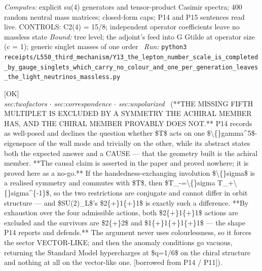 \begin{description}
\emph{Computes:} explicit su(4) generators and tensor-product Casimir spectra; 400 random neutral mass matrices; closed-form caps; P14 and P15 sentences read live. CONTROLS: C2(4) = 15/8; independent operator coefficients leave no massless state
 \emph{Bound:} tree level; the adjoint's feed into G Gtilde at operator size (c = 1); generic singlet masses of one order
\ \emph{Run:} \texttt{python3 receipts/L550\_third\_mechanism/Y13\_the\_lepton\_number\_scale\_is\_completed\_by\_gauge\_singlets\_which\_carry\_no\_colour\_and\_one\_per\_generation\_leaves\_the\_light\_neutrinos\_massless.py}
\item[\label{rcpt:W1_the_two_plus_one_plus_one_is_excluded_by_a_symmetry_the_chiral_member_does_not_have}\textbf{}\quad\texttt{W1\_the\_two\_plus\_one\_plus\_one\_is\_excluded\_by\_a\_symmetry\_the\_chiral\_member\_does\_not\_have}]\hfill\textsf{[OK]}\\
\textit{sec:twofactors \ensuremath{\cdot} sec:correspondence \ensuremath{\cdot} sec:unpolarized} \ (**THE MISSING FIFTH MULTIPLET IS EXCLUDED BY A SYMMETRY THE ACHIRAL MEMBER HAS, AND THE CHIRAL MEMBER PROVABLY DOES NOT.** P14 records as well-posed and declines the question whether \$T\$ acts on one \$\textbackslash\{\}gamma\textasciicircum{}5\$-eigenspace of the wall mode and trivially on the other, while its abstract states both the expected answer and a CAUSE --- that the geometry built is the achiral member. **The causal claim is asserted in the paper and proved nowhere; it is proved here as a no-go.** If the handedness-exchanging involution \$\textbackslash\{\}sigma\$ is a realised symmetry and commutes with \$T\$, then \$T\textbar{}\_-=\textbackslash\{\}sigma T\textbar{}\_+\textbackslash\{\}sigma\textasciicircum{}\{-1\}\$, so the two restrictions are conjugate and cannot differ in orbit structure --- and \$SU(2)\_L\$'s \$2\{+\}1\{+\}1\$ is exactly such a difference. **By exhaustion over the four admissible actions, both \$2\{+\}1\{+\}1\$ actions are excluded and the survivors are \$2\{+\}2\$ and \$1\{+\}1\{+\}1\{+\}1\$ --- the shape P14 reports and defends.** The argument never uses colourlessness, so it forces the sector VECTOR-LIKE; and then the anomaly conditions go vacuous, returning the Standard Model hypercharges at \$q=1/6\$ on the chiral structure and nothing at all on the vector-like one. [borrowed from P14 / P11]). 

\end{description}
